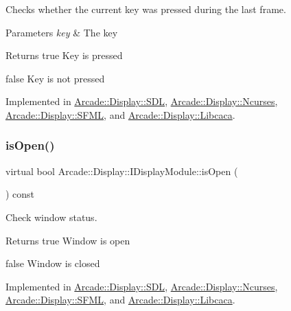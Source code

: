 Checks whether the current key was pressed during the last frame. 


\begin{DoxyParams}{Parameters}
{\em key} & The key \\
\hline
\end{DoxyParams}
\begin{DoxyReturn}{Returns}
true Key is pressed 

false Key is not pressed 
\end{DoxyReturn}


Implemented in \mbox{\hyperlink{classArcade_1_1Display_1_1SDL_a14dd612e3902b1daa1d31cca71efcf00}{Arcade\+::\+Display\+::\+S\+DL}}, \mbox{\hyperlink{classArcade_1_1Display_1_1Ncurses_ae32ffc3c3923c09809c6d13822606af1}{Arcade\+::\+Display\+::\+Ncurses}}, \mbox{\hyperlink{classArcade_1_1Display_1_1SFML_a5695d2a080b43f958adf3a63acf5cf78}{Arcade\+::\+Display\+::\+S\+F\+ML}}, and \mbox{\hyperlink{classArcade_1_1Display_1_1Libcaca_a2de2c9cd935fbee371fa5215bd45c137}{Arcade\+::\+Display\+::\+Libcaca}}.

\mbox{\label{classArcade_1_1Display_1_1IDisplayModule_a34c86dd2e7aa60a70c0cc06ccbd34e47}} 
\subsubsection{\texorpdfstring{isOpen()}{isOpen()}}
{\footnotesize\ttfamily virtual bool Arcade\+::\+Display\+::\+I\+Display\+Module\+::is\+Open (\begin{DoxyParamCaption}{ }\end{DoxyParamCaption}) const\hspace{0.3cm}{\ttfamily [pure virtual]}}



Check window status. 

\begin{DoxyReturn}{Returns}
true Window is open 

false Window is closed 
\end{DoxyReturn}


Implemented in \mbox{\hyperlink{classArcade_1_1Display_1_1SDL_a7d86c934d5dde9283e9c70816cf9c8a5}{Arcade\+::\+Display\+::\+S\+DL}}, \mbox{\hyperlink{classArcade_1_1Display_1_1Ncurses_a57f8a7c485cba89aa6862c2b84e442c0}{Arcade\+::\+Display\+::\+Ncurses}}, \mbox{\hyperlink{classArcade_1_1Display_1_1SFML_a77be7097a8ed969dcf1fca6f960d0c4c}{Arcade\+::\+Display\+::\+S\+F\+ML}}, and \mbox{\hyperlink{classArcade_1_1Display_1_1Libcaca_aae9aa5b1c54a2086c4fa92e7710fc845}{Arcade\+::\+Display\+::\+Libcaca}}.

